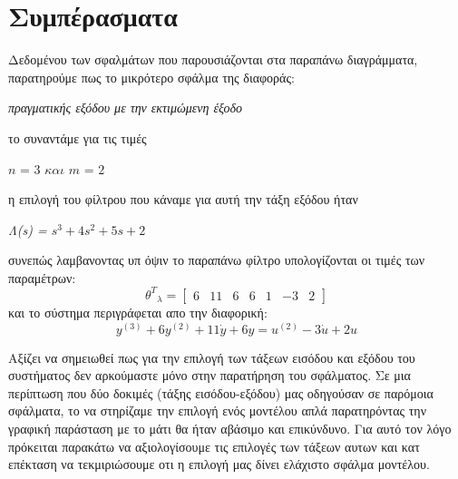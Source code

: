 \documentclass{article}
\begin{document}
\section*{Συμπέρασματα}
\Large
Δεδομένου των σφαλμάτων που παρουσιάζονται στα παραπάνω διαγράμματα, παρατηρούμε πως το μικρότερο σφάλμα της διαφοράς: \begin{center}
\textit{πραγματικής εξόδου με την εκτιμώμενη έξοδο}
\end{center}  το συναντάμε για τις τιμές\begin{center}
$\boxed{\textit{n = 3 και m = 2}}$
\end{center}
η επιλογή του φίλτρου που κάναμε για αυτή την τάξη εξόδου ήταν
\begin{center}
\textit{Λ(s) = $s^3+4s^2+5s+2$}
\end{center}
συνεπώς λαμβανοντας υπ όψιν το παραπάνω φίλτρο υπολογίζονται οι τιμές των παραμέτρων:
\begin{equation*}
{θ^{Τ}}_λ = \begin{bmatrix}
6 &  11 & 6 & 6
     &  1 & -3 & 2   
\end{bmatrix}
\end{equation*}
και το σύστημα περιγράφεται απο την διαφορική:
\begin{equation*}
y^{(3)} + 6y^{(2)} + 11\dot{y} + 6y = u^{(2)} -3\dot{u} + 2u
\end{equation*}
\par Αξίζει να σημειωθεί πως για την επιλογή των τάξεων εισόδου και εξόδου του συστήματος δεν αρκούμαστε μόνο στην παρατήρηση του σφάλματος. Σε μια περίπτωση που δύο δοκιμές (τάξης εισόδου-εξόδου) μας οδηγούσαν σε παρόμοια σφάλματα, το να στηρίζαμε την επιλογή ενός μοντέλου απλά παρατηρόντας την γραφική παράσταση με το μάτι θα ήταν αβάσιμο και επικύνδυνο. Για αυτό τον λόγο πρόκειται παρακάτω να αξιολογίσουμε τις επιλογές των τάξεων αυτων και κατ επέκταση να τεκμιριώσουμε οτι η επιλογή μας δίνει ελάχιστο σφάλμα μοντέλου.   
\large {}
\newpage
\end{document}
